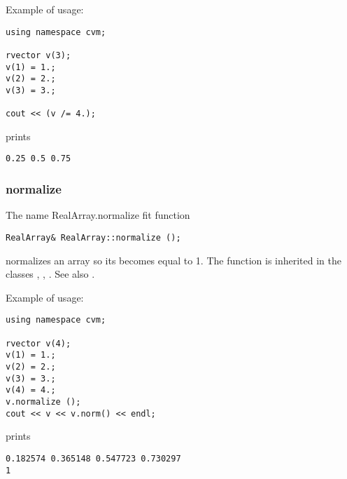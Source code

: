 Example of usage:
\begin{verbatim}
using namespace cvm;

rvector v(3);
v(1) = 1.;
v(2) = 2.;
v(3) = 3.;

cout << (v /= 4.);
\end{verbatim}
prints
\begin{verbatim}
0.25 0.5 0.75
\end{verbatim}
\newpage



\subsubsection{normalize}
The%
\pdfdest name {RealArray.normalize} fit
function
\begin{verbatim}
RealArray& RealArray::normalize ();
\end{verbatim}
normalizes an array so its 
becomes equal to 1. The function is inherited in the classes
,
,
.
See also .

Example of usage:
\begin{verbatim}
using namespace cvm;

rvector v(4);
v(1) = 1.;
v(2) = 2.;
v(3) = 3.;
v(4) = 4.;
v.normalize ();
cout << v << v.norm() << endl;
\end{verbatim}
prints
\begin{verbatim}
0.182574 0.365148 0.547723 0.730297
1
\end{verbatim}
\newpage





